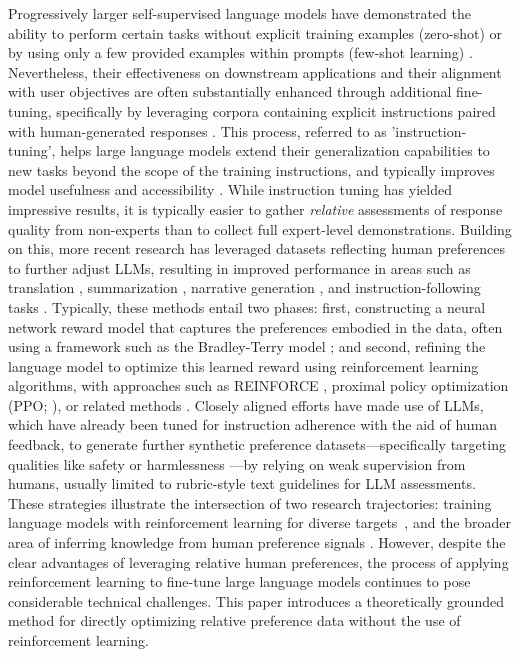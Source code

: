 Progressively larger self-supervised language models have demonstrated the ability to perform certain tasks without explicit training examples (zero-shot) \citep{radford2019language} or by using only a few provided examples within prompts (few-shot learning) \citep{gpt3,megatron,chowdhery2022palm}. Nevertheless, their effectiveness on downstream applications and their alignment with user objectives are often substantially enhanced through additional fine-tuning, specifically by leveraging corpora containing explicit instructions paired with human-generated responses \citep{mishra-etal-2022-cross,sanh2022multitask,chung2022scaling,thoppilan2022lamda}. This process, referred to as 'instruction-tuning', helps large language models extend their generalization capabilities to new tasks beyond the scope of the training instructions, and typically improves model usefulness and accessibility \citep{chung2022scaling}. While instruction tuning has yielded impressive results, it is typically easier to gather \textit{relative} assessments of response quality from non-experts than to collect full expert-level demonstrations. Building on this, more recent research has leveraged datasets reflecting human preferences to further adjust LLMs, resulting in improved performance in areas such as translation \citep{kreutzer-etal-2018-reliability}, summarization \citep{stiennon2022learning,ziegler2020finetuning}, narrative generation \citep{ziegler2020finetuning}, and instruction-following tasks \citep{ouyang2022training,ramamurthy2023is}. Typically, these methods entail two phases: first, constructing a neural network reward model that captures the preferences embodied in the data, often using a framework such as the Bradley-Terry model \citep{bradley1952rankanalysis}; and second, refining the language model to optimize this learned reward using reinforcement learning algorithms, with approaches such as REINFORCE \citep{williams1992reinforce}, proximal policy optimization (PPO; \cite{schulman2017proximal}), or related methods \citep{ramamurthy2023is}. Closely aligned efforts have made use of LLMs, which have already been tuned for instruction adherence with the aid of human feedback, to generate further synthetic preference datasets—specifically targeting qualities like safety or harmlessness \citep{bai2022constitutional}—by relying on weak supervision from humans, usually limited to rubric-style text guidelines for LLM assessments. These strategies illustrate the intersection of two research trajectories: training language models with reinforcement learning for diverse targets~\citep{Ranzato2015SequenceLT,paulus2018a,wu2018learning}, and the broader area of inferring knowledge from human preference signals \citep{christiano2017deep,kupcsik2018learning}. However, despite the clear advantages of leveraging relative human preferences, the process of applying reinforcement learning to fine-tune large language models continues to pose considerable technical challenges. This paper introduces a theoretically grounded method for directly optimizing relative preference data without the use of reinforcement learning.

